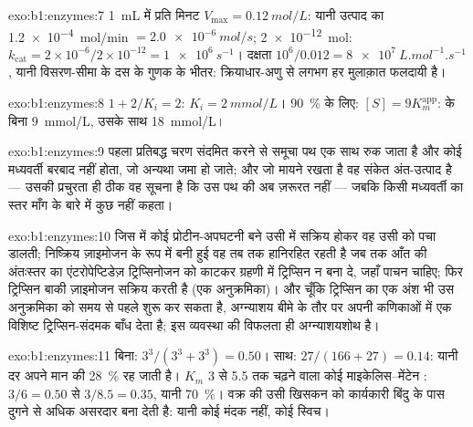 \begin{solution}{exo:b1:enzymes:7}
\qty{1}{mL} में प्रति मिनट $V_{\max} = \qty{0.12}{mol/L}$:
यानी उत्पाद का \qty{1.2e-4}{mol/min} $= \qty{2.0e-6}{mol/s}$; 
\qty{2e-12}{mol}: $k_{\mathrm{cat}} = 2\times 10^{-6}/2\times 10^{-12} =
\qty{1e6}{s^{-1}}$। दक्षता $10^6/0.012 = \qty{8e7}{L.mol^{-1}.s^{-1}}$,
यानी विसरण-सीमा के दस के गुणक के भीतर: क्रियाधार-अणु से लगभग हर मुलाक़ात
फलदायी है।
\end{solution}

\begin{solution}{exo:b1:enzymes:8}
$1 + 2/K_i = 2$: $K_i = \qty{2}{mmol/L}$। \qty{90}{\%} के लिए:
$[S] = 9K_m^{\mathrm{app}}$:  के बिना \qty{9}{mmol/L}, उसके साथ
\qty{18}{mmol/L}।
\end{solution}

\begin{solution}{exo:b1:enzymes:9}
पहला प्रतिबद्ध चरण संदमित करने से समूचा पथ एक साथ रुक जाता है और कोई
मध्यवर्ती बरबाद नहीं होता, जो अन्यथा जमा हो जाते; और जो मायने रखता है वह
संकेत अंत-उत्पाद है --- उसकी प्रचुरता ही ठीक वह सूचना है कि उस पथ की अब
ज़रूरत नहीं --- जबकि किसी मध्यवर्ती का स्तर माँग के बारे में कुछ नहीं कहता।
\end{solution}

\begin{solution}{exo:b1:enzymes:10}
जिस  में कोई प्रोटीन-अपघटनी बने उसी में सक्रिय होकर वह उसी 
को पचा डालती; निष्क्रिय ज़ाइमोजन के रूप में बनी हुई वह तब तक हानिरहित
रहती है जब तक आँत की अंतःस्तर का  एंटरोपेप्टिडेज़ ट्रिप्सिनोजन को
काटकर ग्रहणी में ट्रिप्सिन न बना दे, जहाँ पाचन चाहिए; फिर ट्रिप्सिन बाकी
ज़ाइमोजन सक्रिय करती है (एक अनुक्रमिका)। और चूँकि ट्रिप्सिन का एक अंश भी
उस अनुक्रमिका को समय से पहले शुरू कर सकता है, अग्न्याशय बीमे के तौर पर
अपनी कणिकाओं में एक विशिष्ट ट्रिप्सिन-संदमक बाँध देता है; इस व्यवस्था की
विफलता ही अग्न्याशयशोथ है।
\end{solution}

\begin{solution}{exo:b1:enzymes:11}
बिना: $3^3/(3^3 + 3^3) = 0.50$। साथ: $27/(166 + 27) = 0.14$: यानी
दर अपने मान की \qty{28}{\%} रह जाती है। $K_m$ 3 से 5.5 तक चढ़ने वाला कोई
माइकेलिस--मेंटेन : $3/6 = 0.50$ से $3/8.5 = 0.35$, यानी
\qty{70}{\%}।  वक्र की उसी खिसकन को कार्यकारी बिंदु के पास दुगने
से अधिक असरदार बना देती है: यानी कोई मंदक नहीं, कोई
स्विच।
\end{solution}

